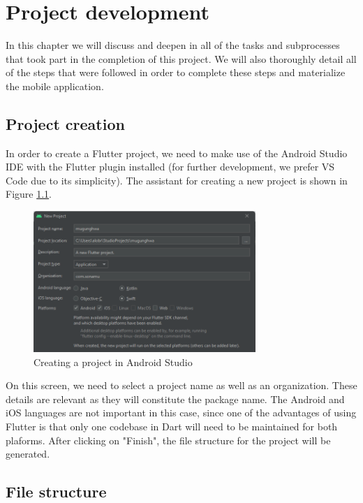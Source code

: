 \chapter{Project development}
\label{chapter6}

In this chapter we will discuss and deepen in all of the tasks and subprocesses that took part in the completion of this project. We will also thoroughly detail all of the steps that were followed in order to complete these steps and materialize the mobile application.

\section{Project creation}

In order to create a Flutter project, we need to make use of the Android Studio IDE with the Flutter plugin installed (for further development, we prefer VS Code due to its simplicity). The assistant for creating a new project is shown in Figure \ref{fig:project-creation}.

\begin{figure}[h]
  \centering
  \includegraphics[width=0.75\textwidth]{Figures/project-creation.png}
  \caption{
    Creating a project in Android Studio
  }
  \label{fig:project-creation}
\end{figure}

On this screen, we need to select a project name as well as an organization. These details are relevant as they will constitute the package name. The Android and iOS languages are not important in this case, since one of the advantages of using Flutter is that only one codebase in Dart will need to be maintained for both plaforms. After clicking on "Finish", the file structure for the project will be generated.

\clearpage
\section{File structure}

